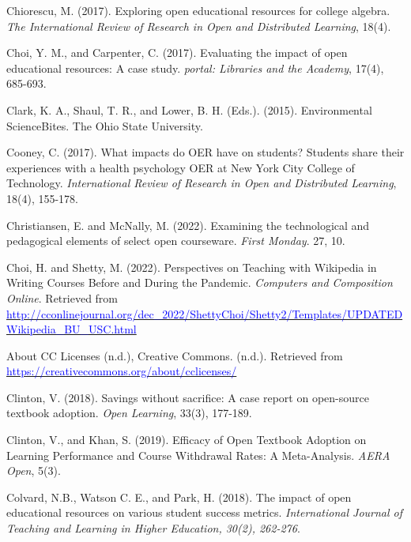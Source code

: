 \documentclass[11pt]{article}
\newcommand{\alink}[2]{\href{#1}{\textcolor{blue}{#2}}}
\begin{document}
\begin{thebibliography}{99}
   Chiorescu, M. (2017). Exploring open educational resources for college algebra. {\em The International Review of Research in Open and Distributed Learning}, 18(4).

   Choi, Y. M., and Carpenter, C. (2017). Evaluating the impact of open educational resources: A case study. {\em portal: Libraries and the Academy}, 17(4), 685-693.

   Clark, K. A., Shaul, T. R., and Lower, B. H. (Eds.). (2015). Environmental ScienceBites. The Ohio State University.

   Cooney, C. (2017). What impacts do OER have on students? Students share their experiences with a health psychology OER at New York City College of Technology. {\em International Review of Research in Open and Distributed Learning}, 18(4), 155-178.

   Christiansen, E. and McNally, M. (2022). Examining the technological and pedagogical elements of select open courseware. {\em First Monday}. 27, 10.%

   Choi, H. and Shetty, M. (2022). Perspectives on Teaching with Wikipedia in Writing Courses Before and During the Pandemic. {\em Computers and Composition Online}. Retrieved from \alink{http://cconlinejournal.org/dec\_2022/ShettyChoi/Shetty2/Templates/UPDATEDWikipedia\_BU\_USC.html}{http://cconlinejournal.org/dec\_2022/ShettyChoi/Shetty2/Templates/UPDATEDWikipedia\_BU\_USC.html}

   About CC Licenses (n.d.), Creative Commons. (n.d.). Retrieved from \alink{https://creativecommons.org/about/cclicenses/}{https://creativecommons.org/about/cclicenses/}

   Clinton, V. (2018). Savings without sacrifice: A case report on open-source textbook adoption. {\em Open Learning}, 33(3), 177-189.

   Clinton, V., and Khan, S. (2019). Efficacy of Open Textbook Adoption on Learning Performance and Course Withdrawal Rates: A Meta-Analysis. {\em AERA Open}, 5(3).%

 Colvard, N.\/B., Watson C.\/ E., and Park, H. (2018). The impact of open educational resources on various student success metrics. {\em International Journal of Teaching and Learning in Higher Education, 30(2), 262-276}.


\end{thebibliography}
\end{document}
